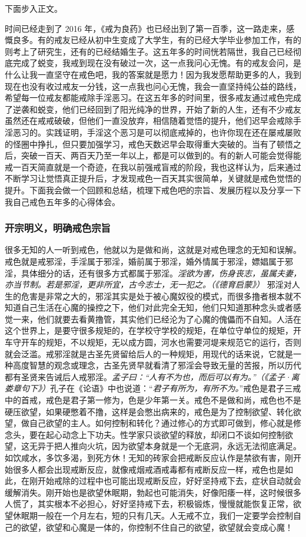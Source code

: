 下面步入正文。

时间已经走到了 2016 年，《戒为良药》也已经出到了第一百季，这一路走来，感慨良多。有的戒友已经从初中生变成了大学生，有的已经大学毕业参加工作，有的则考上了研究生，还有的已经结婚生子。这五年多的时间恍若隔世，我自己已经彻底完成了蜕变，我戒到现在没有破过一次，这一点我问心无愧。有的戒友会问，是什么让我一直坚守在戒色吧，我的答案就是愿力！因为我发愿帮助更多的人，我到现在也没有收过戒友一分钱，这一点我也问心无愧，我会一直坚持纯公益的路线，希望每一位戒友都能戒除手淫恶习。在这五年多的时间里，很多戒友通过戒色完成了逆袭和蜕变，他们已经回到了阳光纯净的世界，开始了新的人生，还有不少戒友虽然还在戒戒破破，但他们一直没放弃，相信随着觉悟的提升，他们迟早会戒除手淫恶习的。实践证明，手淫这个恶习是可以彻底戒掉的，也许你现在还在屡戒屡败的怪圈中挣扎，但只要加强学习，戒色天数迟早会取得重大突破的。当有了顿悟之后，突破一百天、两百天乃至一年以上，都是可以做到的。有的新人可能会觉得能戒一百天简直就是一个奇迹，在我以前强戒盲戒的阶段，我也这样认为，后来通过不断学习让觉悟真正提升后，才发现戒色一百天其实很简单，关键就是戒色觉悟的提升。下面我会做一个回顾和总结，梳理下戒色吧的宗旨、发展历程以及分享一下我自己戒色五年多的心得体会。

\subsubsection{开宗明义，明确戒色宗旨}

很多无知的人一听到戒色，他就以为是做和尚，这就是对戒色理念的无知和误解。戒色就是戒邪淫，手淫属于邪淫，婚前属于邪淫，婚外情属于邪淫，嫖娼属于邪淫，具体细分的话，还有很多方式都属于邪淫。\textit{淫欲为害，伤身丧志，虽属夫妻，亦当节制。若是邪淫，更非所宜，古今志士，无一犯之。（《德育启蒙》）} 邪淫对人生的危害是非常之大的，邪淫其实是处于被心魔奴役的模式，而很多撸者根本就不知道自己生活在心魔的操控之下，他们对此完全无知，他们只知道那种念头或者感觉一来，他们就要去看黄撸管，其实他们已经沦为了心魔的傀儡而不自知。人活在这个世界上，是要守很多规矩的，在学校守学校的规矩，在单位守单位的规矩，开车守开车的规矩，不以规矩，无以成方圆，河水也需要河堤来规范它的运行，否则就会泛滥。戒邪淫就是古圣先贤留给后人的一种规矩，用现代的话来说，它就是一种高度智慧的观念或理念，古圣先贤早就看清了邪淫会导致无量的苦报，所以历代都有圣贤来告诫后人戒邪淫。\textit{孟子曰：“人有不为也，而后可以有为。”（《孟子·离娄章句下》）}孔子在《论语》中也说道：“\textit{君子有所为，有所不为。}”戒色是君子三戒中的首戒，戒色是君子第一修为，色是少年第一关。戒色不是做和尚，戒色也不是硬压欲望，如果硬憋着不撸，这样是会憋出病来的，戒色是为了控制欲望、转化欲望，做自己欲望的主人。如何控制和转化？通过修心的方式即可做到，修心就是修念头，要在起心动念上下功夫。性学家只谈欲望的释放，却闭口不谈如何控制欲望，这无异于把人推向火坑，因为欲望本身就是一个无底洞，永远无法彻底满足。如饮咸水，多饮多渴，到死方休！无知的砖家会把戒断反应认作是禁欲有害，刚开始很多人都会出现戒断反应，就像戒烟戒酒戒毒都有戒断反应一样，戒色也是如此，在刚开始戒除的过程中也可能出现戒断反应，好好坚持戒下去，症状自动就会缓解消失。刚开始也是欲望休眠期，勃起也可能消失，好像阳痿一样，这时候很多人慌了，其实根本不必担心，好好坚持戒下去，积极锻炼，慢慢就能恢复正常，欲望休眠期一般在一个月左右，短的只有几天。人无戒不立，我们一定要学会控制自己的欲望，欲望和心魔是一体的，你控制不住自己的欲望，欲望就会变成心魔！

